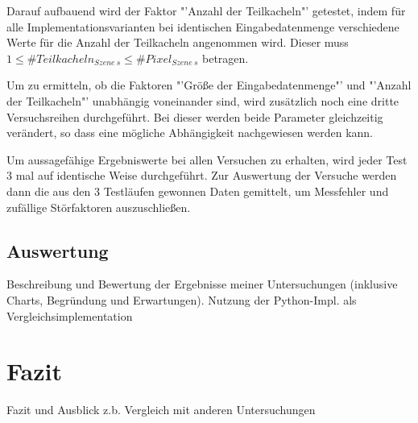 Darauf aufbauend wird der Faktor "'Anzahl der Teilkacheln"' getestet, indem für alle Implementationsvarianten bei identischen Eingabedatenmenge verschiedene Werte für die Anzahl der Teilkacheln angenommen wird. Dieser muss \(1 \leq \mathbin{\#}Teilkacheln_{Szene\ s} \leq \mathbin{\#} Pixel_{Szene\ s} \) betragen. 

Um zu ermitteln, ob die Faktoren "'Größe der Eingabedatenmenge"' und "'Anzahl der Teilkacheln"' unabhängig voneinander sind, wird zusätzlich noch eine dritte Versuchsreihen durchgeführt. Bei dieser werden beide Parameter gleichzeitig verändert, so dass eine mögliche Abhängigkeit nachgewiesen werden kann.

Um aussagefähige Ergebniswerte bei allen Versuchen zu erhalten, wird jeder Test 3 mal auf identische Weise durchgeführt. Zur Auswertung der Versuche werden dann die aus den 3 Testläufen gewonnen Daten gemittelt, um Messfehler und zufällige Störfaktoren auszuschließen. 


\section{Auswertung}
Beschreibung und Bewertung der Ergebnisse meiner Untersuchungen (inklusive Charts, Begründung und Erwartungen). Nutzung der Python-Impl. als Vergleichsimplementation

\chapter{Fazit}
Fazit und Ausblick
z.b. Vergleich mit anderen Untersuchungen

